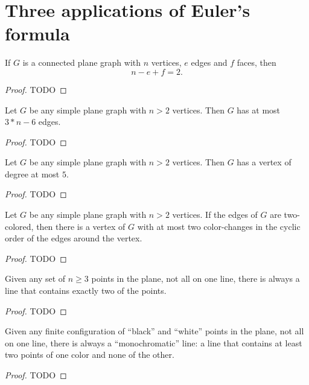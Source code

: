 \chapter{Three applications of Euler's formula}

\begin{theorem}
  \label{euler_formula}
  If \(G\) is a connected plane graph with \(n\) vertices, \(e\) edges and \(f\) faces, then
  \[
  n - e + f = 2.
  \]
\end{theorem}
\begin{proof}
  TODO
\end{proof}


\begin{proposition}
  \label{euler_consequence_a}
  Let \(G\) be any simple plane graph with \(n>2\) vertices.
  Then \(G\) has at most \(3*n - 6\) edges.
\end{proposition}
\begin{proof}
  TODO
\end{proof}

\begin{proposition}
  \label{euler_consequence_b}
  Let \(G\) be any simple plane graph with \(n>2\) vertices.
  Then \(G\) has a vertex of degree at most \(5\).
\end{proposition}
\begin{proof}
  TODO
\end{proof}

\begin{proposition}
  \label{euler_consequence_c}
  Let \(G\) be any simple plane graph with \(n>2\) vertices.
  If the edges of \(G\) are two-colored, then there is a vertex of \(G\) with at most two
  color-changes in the cyclic order of the edges around the vertex.
\end{proposition}
\begin{proof}
  TODO
\end{proof}

\begin{theorem}
  \label{sylvester_gallai2}
  Given any set of \(n \ge 3\) points in the
  plane, not all on one line, there is always a line that contains exactly two
  of the points.
\end{theorem}
\begin{proof}
  TODO
\end{proof}

\begin{theorem}
  \label{monochromatic_lines}
  Given any finite configuration of ``black'' and ``white'' points
  in the plane, not all on one line, there is always a ``monochromatic'' line:
  a line that contains at least two points of one color and none of the other.
\end{theorem}
\begin{proof}
  TODO
\end{proof}


